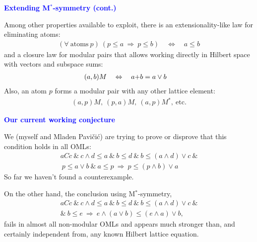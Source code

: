 \documentclass{slides}
\begin{document}
\begin{slide}

\begin{center}
\textcolor{blue}{\textbf{Extending M${}^*$-symmetry (cont.)}}
\end{center}

Among other properties available to exploit, there is an
extensionality-like law for eliminating atoms:
\begin{eqnarray}
  & (\forall \ \mbox{atoms}\ p)\
  (p \le a \ \Rightarrow\ p\le b) \quad \Leftrightarrow \quad a\le b&
\end{eqnarray}
and a closure law for modular pairs that allows working directly
in Hilbert space with vectors and subspace sums:
\begin{eqnarray}
    &(a,b)M \quad \Leftrightarrow \quad a{\bf +}b=a\vee b &
\end{eqnarray}
Also, an atom $p$ forms a modular pair with any other lattice element:
\begin{eqnarray}
(a,p)M,\ (p,a)M,\ (a,p)M^*, \ \mbox{etc.}
\end{eqnarray}

\end{slide}
\begin{slide}

\begin{center}
\textcolor{blue}{\textbf{Our current working conjecture}}
\end{center}

We (myself and Mladen Pavi\v ci\'c) are trying to prove or disprove that
this condition holds in all OMLs:
\begin{eqnarray}
aCc \ \& \ c\wedge d\le a \ \& \ b\le d \ \& \ b\le (a\wedge d)\vee c \ \&
\nonumber\\
\ p\le a\vee b \ \& \ a\le p \ \Rightarrow \ p\le (p\wedge b)\vee a \label{conj1}
\end{eqnarray}
So far we haven't found a counterexample.

On the other hand, the conclusion using M${}^*$-symmetry,
\begin{eqnarray}
aCc \ \& \ c\wedge d\le a \ \& \ b\le d \ \& \ b\le (a\wedge d)\vee c \ \&
\nonumber\\
\& \ b\le e \ \Rightarrow \ e\wedge(a\vee b)\le (e\wedge a)\vee b,
\end{eqnarray}
fails in almost all non-modular OMLs and appears much stronger than, and
certainly independent from, any known Hilbert lattice equation.

\end{slide}
\end{document}
